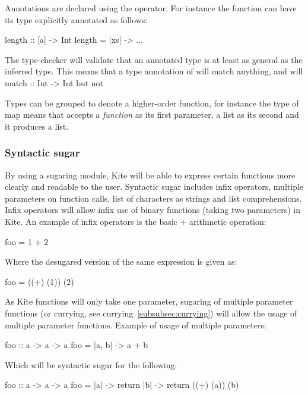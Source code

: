 Annotations are declared using the \code{::} operator. For instance the function  can have its type explicitly annotated as follows:

\begin{kite}
length :: [a] -> Int
length = |xs| -> {
  ...
}
\end{kite}

The type-checker will validate that an annotated type is at least as general as the inferred type. This means that a type annotation of  will match anything, and  will match {:: Int -> Int} but not 

Types can be grouped to denote a higher-order function, for instance the type of map  means that  accepts a \emph{function} as its first parameter, a list as its second and it produces a list.

\subsubsection{Syntactic sugar}
\label{sec:kite-design-sugar}
By using a sugaring module, Kite will be able to express certain functions more clearly and readable to the user. Syntactic sugar includes infix operators, multiple parameters on function calls, list of characters as strings and list comprehensions. Infix operators will allow infix use of binary functions (taking two parameters) in Kite. An example of infix operators is the basic $+$ arithmetic operation:

\begin{kite}
foo = 1 + 2
\end{kite}

Where the desugared version of the same expression is given as:

\begin{kite}
foo = ((+) (1)) (2)
\end{kite}

As Kite functions will only take one parameter, sugaring of multiple parameter functions (or currying, see currying~\ref{subsubsec:currying}) will allow the usage of multiple parameter functions. Example of usage of multiple parameters:

\begin{kite}
foo :: a -> a -> a
foo = |a, b| -> {
  a + b
}
\end{kite}

Which will be syntactic sugar for the following:

\begin{kite}
foo :: a -> a -> a
foo = |a| -> {
  return |b| -> {
    return ((+) (a)) (b)
  }
}
\end{kite}

